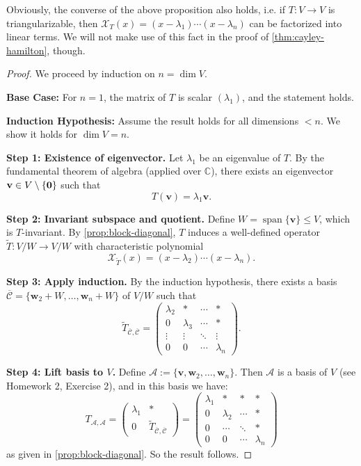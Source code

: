 Obviously, the converse of the above proposition also holds, i.e. if $T:V \to V$ is triangularizable, then $\mathcal{X}_T(x) = (x - \lambda_1) \cdots (x - \lambda_n)$ can be factorized into linear terms. We will not make use of this fact in the proof of \autoref{thm:cayley-hamilton}, though.
\begin{proof}
We proceed by induction on \( n = \dim V \).

\textbf{Base Case:} For \( n = 1 \), the matrix of \( T \) is scalar \( (\lambda_1) \), and the statement holds.

\textbf{Induction Hypothesis:} Assume the result holds for all dimensions \( < n \). We show it holds for \( \dim V = n \).

\textbf{Step 1: Existence of eigenvector.}
Let \( \lambda_1 \) be an eigenvalue of \( T \). By the fundamental theorem of algebra (applied over \( \mathbb{C} \)), there exists an eigenvector \( \mathbf{v} \in V \setminus \{{\bf 0}\} \) such that
\[
T(\mathbf{v}) = \lambda_1 \mathbf{v}.
\]

\textbf{Step 2: Invariant subspace and quotient.}
Define \( W = \operatorname{span}\{\mathbf{v}\} \leq V \), which is \( T \)-invariant. By \autoref{prop:block-diagonal}, \( T \) induces a well-defined operator \( \widetilde{T} : V/W \to V/W \) with characteristic polynomial
\[
\mathcal{X}_{\widetilde{T}}(x) = (x - \lambda_2) \cdots (x - \lambda_n).
\]

\textbf{Step 3: Apply induction.}
By the induction hypothesis, there exists a basis \( \overline{\mathcal{C}} = \{ \mathbf{w}_2 + W, \dots, \mathbf{w}_n + W \} \) of \( V/W \) such that
\[
\widetilde{T}_{\overline{\mathcal{C}}, \overline{\mathcal{C}}} =
\begin{pmatrix}
\lambda_2 & * & \cdots & * \\
0 & \lambda_3 & \cdots & * \\
\vdots & \vdots & \ddots & \vdots \\
0 & 0 & \cdots & \lambda_n
\end{pmatrix}.
\]

\textbf{Step 4: Lift basis to \( V \).}
Define \( \mathcal{A} := \{ \mathbf{v}, \mathbf{w}_2, \dots, \mathbf{w}_n \} \). Then \( \mathcal{A} \) is a basis of \( V \) (see Homework 2, Exercise 2), and in this basis we have:
\[
T_{\mathcal{A}, \mathcal{A}} =
\begin{pmatrix}
\lambda_1 & * \\
0 & \widetilde{T}_{\overline{\mathcal{C}}, \overline{\mathcal{C}}}
\end{pmatrix}
=
\begin{pmatrix}
\lambda_1 & * & * & * \\
0 & \lambda_2 & \cdots & * \\
0 & \cdots & \ddots & * \\
0 & 0 & \cdots & \lambda_n
\end{pmatrix}
\]
as given in \autoref{prop:block-diagonal}. So the result follows.
\end{proof}
